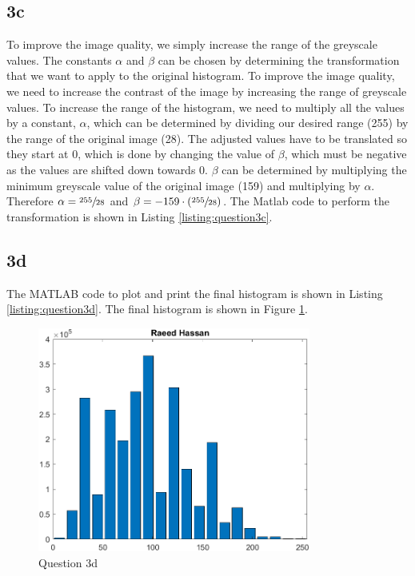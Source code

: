 \documentclass[12pt]{article}
\begin{document}
\subsection*{3c}
To improve the image quality, we simply increase the range of the greyscale values. The constants $\alpha$ and $\beta$ can be chosen by determining the transformation that we want to apply to the original histogram. To improve the image quality, we need to increase the contrast of the image by increasing the range of greyscale values. To increase the range of the histogram, we need to multiply all the values by a constant, $\alpha$, which can be determined by dividing our desired range (255) by the range of the original image (28). The adjusted values have to be translated so they start at 0, which is done by changing the value of $\beta$, which must be negative as the values are shifted down towards 0. $\beta$ can be determined by multiplying the minimum greyscale value of the original image (159) and multiplying by $\alpha$. Therefore $\alpha = \sfrac{255}{28}$ and $\beta = -159\cdot(\sfrac{255}{28})$. The Matlab code to perform the transformation is shown in Listing \ref{listing:question3c}.

\subsection*{3d}
The MATLAB code to plot and print the final histogram is shown in Listing \ref{listing:question3d}. The final histogram is shown in Figure \ref{fig:question3d}.

\begin{figure}[!ht]
    \centering
    \includegraphics[width=0.8\textwidth]{question3d.png}
    \caption{Question 3d}
    \label{fig:question3d}
\end{figure} \pagebreak
\end{document}
